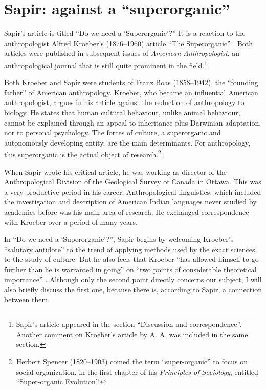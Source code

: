 \documentclass[output=paper]{langscibook}
\begin{document}
\section{Sapir: against a ``superorganic''}
\label{sec:elffers:superorganic}

Sapir's \citeyear{Sapir1917} article is titled ``Do we need a `Superorganic'?'' It is a reaction to the anthropologist Alfred Kroeber's (1876–1960) article ``The Superorganic'' \citep{Kroeber1917}. Both articles were published in subsequent issues of \emph{American Anthropologist}, an anthropological journal that is still quite prominent in the field.\footnote{Sapir's article appeared in the section ``Discussion and correspondence''. Another comment on Kroeber's article by A. A. \citet{Goldenweiser1917} was included in the same section.}

Both Kroeber and Sapir were students of Franz Boas (1858–1942), the ``founding father'' of American anthropology. Kroeber, who became an influential American anthropologist, argues in his \citeyear{Kroeber1917} article against the reduction of anthropology to biology. He states that human cultural behaviour, unlike animal behaviour, cannot be explained through an appeal to inheritance plus Darwinian adaptation, nor to personal psychology. The forces of culture, a superorganic and autonomously developing entity, are the main determinants. For anthropology, this superorganic is the actual object of research.\footnote{Herbert Spencer (1820–1903) coined the term ``super-organic'' to focus on social organization, in the first chapter of his \citeyear{Spencer1898} \emph{Principles of Sociology}, entitled ``Super-organic Evolution''.}

When Sapir wrote his critical article, he was working as director of the Anthropological Division of the Geological Survey of Canada in Ottawa. This was a very productive period in his career. Anthropological linguistics, which included the investigation and description of American Indian languages never studied by academics before was his main area of research. He exchanged correspondence with Kroeber over a period of many years.

In ``Do we need a `Superorganic'?'', Sapir begins by welcoming Kroeber's ``salutary antidote'' to the trend of applying methods used by the exact sciences to the study of culture. But he also feels that Kroeber ``has allowed himself to go further than he is warranted in going'' on ``two points of considerable theoretical importance'' \citep[441]{Sapir1917}. Although only the second point directly concerns our subject, I will also briefly discuss the first one, because there is, according to Sapir, a connection between them.
\end{document}
